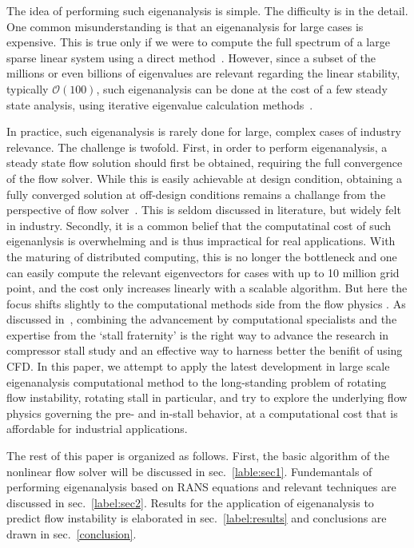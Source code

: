 \documentclass[journal,final]{new-aiaa}
\begin{document}
The idea of performing such eigenanalysis is simple. The difficulty is in the detail.
One common misunderstanding is that an eigenanalysis for large cases is expensive.
This is true only if we were to compute the full spectrum of a large sparse linear system
using a direct method~\cite{amestoy2000mumps}.
However, since a subset of the millions or even billions of eigenvalues are relevant regarding
the linear stability, typically $\mathcal O(100)$, such eigenanalysis can be done at the cost of
a few steady state analysis, using iterative eigenvalue calculation
methods~\cite{sorensen1992implicit,lehoucq1998arpack}.

In practice, such eigenanalysis is rarely done for large, complex cases of industry relevance.
The challenge is twofold. First,
in order to perform eigenanalysis, a steady state flow solution should first be
obtained, requiring the full convergence of the flow solver. While this is easily
achievable at design condition, obtaining a fully converged solution at off-design
conditions remains a challange from the perspective of flow solver~\cite{xu2015stabilisation}.
This is seldom discussed in literature, but widely felt in industry. Secondly, it is
a common belief that the  computatinal cost of such eigenanlysis is overwhelming
and is thus impractical for real applications. With the maturing of distributed
computing, this is no longer the bottleneck and one can easily compute the
relevant eigenvectors for cases with up to 10 million grid point, and the cost
only increases linearly with a scalable algorithm. But here the focus shifts slightly
to the computational methods side from the flow physics . As discussed
in~\cite{day2016stall}, combining the advancement by computational specialists
and the expertise from the `stall fraternity' is the right way to advance the research
in compressor stall study and an effective way to harness better the benifit of
using CFD. In this paper, we attempt to apply the latest development in large
scale eigenanalysis computational method to the long-standing problem of
rotating flow instability, rotating stall in particular, and try to explore the
underlying flow physics governing the pre- and in-stall behavior, at a
computational cost that is affordable for industrial applications.

The rest of this paper is organized as follows. First, the basic algorithm of the
nonlinear flow solver will be discussed in sec.~\ref{lable:sec1}. Fundemantals of 
performing eigenanalysis based on RANS equations and relevant techniques
are discussed in sec.~\ref{label:sec2}. Results for the application of eigenanalysis
to predict flow instability is elaborated in sec.~\ref{label:results} and conclusions
are drawn in sec.~\ref{conclusion}.
\end{document}
